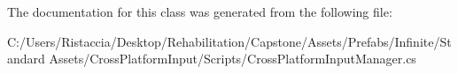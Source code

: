 The documentation for this class was generated from the following file\+:\begin{DoxyCompactItemize}
\item 
C\+:/\+Users/\+Ristaccia/\+Desktop/\+Rehabilitation/\+Capstone/\+Assets/\+Prefabs/\+Infinite/\+Standard Assets/\+Cross\+Platform\+Input/\+Scripts/Cross\+Platform\+Input\+Manager.\+cs\end{DoxyCompactItemize}
